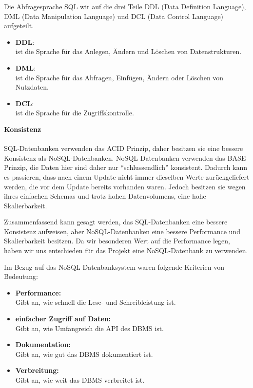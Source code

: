 Die Abfragesprache SQL wir auf die drei Teile \gls{DDL} (Data Definition Language), \gls{DML} (Data Manipulation Language) und \gls{DCL} (Data Control Language) aufgeteilt.

\begin{itemize}
	\item \textbf{\gls{DDL}}:\\ ist die Sprache f\"ur das Anlegen, \"Andern und L\"oschen von Datenstrukturen.
	\item \textbf{\gls{DML}}:\\ ist die Sprache f\"ur das Abfragen, Einf\"ugen, \"Andern oder L\"oschen von Nutzdaten.
	\item \textbf{\gls{DCL}}:\\ ist die Sprache f\"ur die Zugriffskontrolle.
\end{itemize}

\newpage

\textbf{Konsistenz}\\\\
\gls{SQL}-Datenbanken verwenden das \gls{ACID} Prinzip, daher besitzen sie eine bessere Konsistenz als
\gls{NoSQL}-Datenbanken. \gls{NoSQL} Datenbanken verwenden das \gls{BASE} Prinzip, die Daten hier sind daher
nur "`schlussendlich"' konsistent. Dadurch kann es passieren, dass nach einem Update nicht immer
dieselben Werte zur\"uckgeliefert werden, die vor dem Update bereits vorhanden waren. Jedoch besitzen sie wegen ihres einfachen Schemas und trotz hohen Datenvolumens, eine hohe Skalierbarkeit.

Zusammenfassend kann gesagt werden, das \gls{SQL}-Datenbanken eine bessere Konsistenz aufweisen, aber \gls{NoSQL}-Datenbanken eine bessere Performance und Skalierbarkeit besitzen. Da wir besonderen Wert auf die Performance
legen, haben wir uns entschieden für das Projekt eine \gls{NoSQL}-Datenbank zu verwenden.

Im Bezug auf das \gls{NoSQL}-Datenbanksystem waren folgende Kriterien von Bedeutung:

\begin{itemize}
	\item \textbf{Performance:} \\Gibt an, wie schnell die Lese- und Schreibleistung ist.
	\item \textbf{einfacher Zugriff auf Daten:} \\Gibt an, wie Umfangreich die API des DBMS ist.
	\item \textbf{Dokumentation:}\\ Gibt an, wie gut das \gls{DBMS} dokumentiert ist.
	\item \textbf{Verbreitung:}\\ Gibt an, wie weit das \gls{DBMS} verbreitet ist.
\end{itemize}

